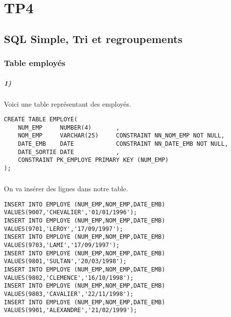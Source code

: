 \documentclass{report}
\begin{document}

\chapter{TP4}

\section{SQL Simple, Tri et regroupements}

\subsection{Table employés}

\paragraph{1)}Voici une table représentant des employés.

\begin{lstlisting}
CREATE TABLE EMPLOYE(
	NUM_EMP		NUMBER(4)		,
	NOM_EMP		VARCHAR(25)		CONSTRAINT NN_NOM_EMP NOT NULL,
	DATE_EMB	DATE			CONSTRAINT NN_DATE_EMB NOT NULL,
	DATE_SORTIE	DATE			,
	CONSTRAINT PK_EMPLOYE PRIMARY KEY (NUM_EMP)
);
\end{lstlisting}

\paragraph{}On va insérer des lignes dans notre table.

\begin{lstlisting}
INSERT INTO EMPLOYE (NUM_EMP,NOM_EMP,DATE_EMB) VALUES(9007,'CHEVALIER','01/01/1996');
INSERT INTO EMPLOYE (NUM_EMP,NOM_EMP,DATE_EMB) VALUES(9701,'LEROY','17/09/1997');
INSERT INTO EMPLOYE (NUM_EMP,NOM_EMP,DATE_EMB) VALUES(9703,'LAMI','17/09/1997');
INSERT INTO EMPLOYE (NUM_EMP,NOM_EMP,DATE_EMB) VALUES(9801,'SULTAN','20/03/1998');
INSERT INTO EMPLOYE (NUM_EMP,NOM_EMP,DATE_EMB) VALUES(9802,'CLEMENCE','16/10/1998');
INSERT INTO EMPLOYE (NUM_EMP,NOM_EMP,DATE_EMB) VALUES(9803,'CAVALIER','22/11/1998');
INSERT INTO EMPLOYE (NUM_EMP,NOM_EMP,DATE_EMB) VALUES(9901,'ALEXANDRE','21/02/1999');
\end{lstlisting}
\end{document}

